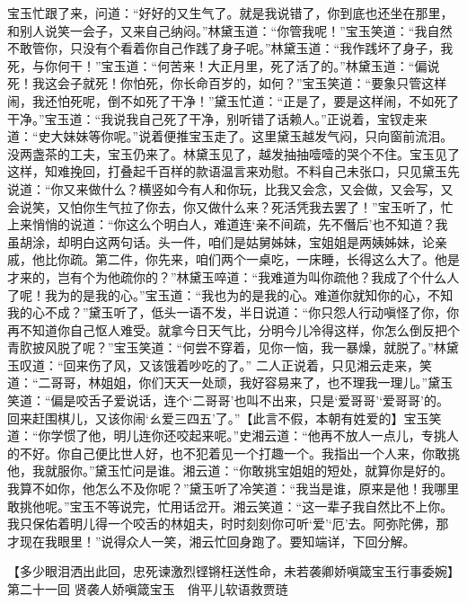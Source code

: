 \documentclass[12pt,oneside]{book}
\begin{document}
宝玉忙跟了来，问道：“好好的又生气了。就是我说错了，你到底也还坐在那里，和别人说笑一会子，又来自己纳闷。”林黛玉道：“你管我呢！”宝玉笑道：“我自然不敢管你，只没有个看着你自己作践了身子呢。”林黛玉道：“我作践坏了身子，我死，与你何干！”宝玉道：“何苦来！大正月里，死了活了的。”林黛玉道：“偏说死！我这会子就死！你怕死，你长命百岁的，如何？”宝玉笑道：“要象只管这样闹，我还怕死呢，倒不如死了干净！”黛玉忙道：“正是了，要是这样闹，不如死了干净。”宝玉道：“我说我自己死了干净，别听错了话赖人。”正说着，宝钗走来道：“史大妹妹等你呢。”说着便推宝玉走了。这里黛玉越发气闷，只向窗前流泪。
没两盏茶的工夫，宝玉仍来了。林黛玉见了，越发抽抽噎噎的哭个不住。宝玉见了这样，知难挽回，打叠起千百样的款语温言来劝慰。不料自己未张口，只见黛玉先说道：“你又来做什么？横竖如今有人和你玩，比我又会念，又会做，又会写，又会说笑，又怕你生气拉了你去，你又做什么来？死活凭我去罢了！”宝玉听了，忙上来悄悄的说道：“你这么个明白人，难道连‘亲不间疏，先不僭后’也不知道？我虽胡涂，却明白这两句话。头一件，咱们是姑舅姊妹，宝姐姐是两姨姊妹，论亲戚，他比你疏。第二件，你先来，咱们两个一桌吃，一床睡，长得这么大了。他是才来的，岂有个为他疏你的？”林黛玉啐道：“我难道为叫你疏他？我成了个什么人了呢！我为的是我的心。”宝玉道：“我也为的是我的心。难道你就知你的心，不知我的心不成？”黛玉听了，低头一语不发，半日说道：“你只怨人行动嗔怪了你，你再不知道你自己怄人难受。就拿今日天气比，分明今儿冷得这样，你怎么倒反把个青肷披风脱了呢？”宝玉笑道：“何尝不穿着，见你一恼，我一暴燥，就脱了。”林黛玉叹道：“回来伤了风，又该饿着吵吃的了。”
二人正说着，只见湘云走来，笑道：“二哥哥，林姐姐，你们天天一处顽，我好容易来了，也不理我一理儿。”黛玉笑道：“偏是咬舌子爱说话，连个‘二哥哥’也叫不出来，只是‘爱哥哥’‘爱哥哥’的。回来赶围棋儿，又该你闹‘ㄠ爱三四五’了。”【此言不假，本朝有姓爱的】宝玉笑道：“你学惯了他，明儿连你还咬起来呢。”史湘云道：“他再不放人一点儿，专挑人的不好。你自己便比世人好，也不犯着见一个打趣一个。我指出一个人来，你敢挑他，我就服你。”黛玉忙问是谁。湘云道：“你敢挑宝姐姐的短处，就算你是好的。我算不如你，他怎么不及你呢？”黛玉听了冷笑道：“我当是谁，原来是他！我哪里敢挑他呢。”宝玉不等说完，忙用话岔开。湘云笑道：“这一辈子我自然比不上你。我只保佑着明儿得一个咬舌的林姐夫，时时刻刻你可听‘爱’‘厄’去。阿弥陀佛，那才现在我眼里！”说得众人一笑，湘云忙回身跑了。要知端详，下回分解。

 
【多少眼泪洒出此回，忠死谏激烈铿锵枉送性命，未若袭卿娇嗔箴宝玉行事委婉】
第二十一回  贤袭人娇嗔箴宝玉　俏平儿软语救贾琏
\end{document}
